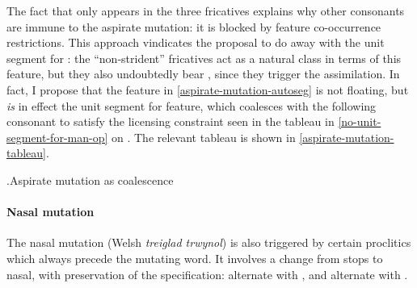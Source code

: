 The fact that  only appears in the three fricatives \ipa{[f~θ~χ]} explains why other consonants are immune to the aspirate mutation: it is blocked by feature co\hyp occurrence restrictions. This approach vindicates the proposal to do away with the unit segment for : the \enquote{non\hyp strident} fricatives \ipa{[f~θ~χ]} act as a natural class in terms of this feature, but they also undoubtedly bear , since they trigger the  assimilation. In fact, I propose that the  feature in \cref{aspirate-mutation-autoseg} is not floating, but \emph{is} in effect the unit segment for  feature, which coalesces with the following consonant to satisfy the licensing constraint seen in the tableau in \ref{no-unit-segment-for-man-op} on . The relevant tableau is shown in \cref{aspirate-mutation-tableau}.

\ex.\label{aspirate-mutation-tableau}Aspirate mutation as coalescence\\

\paragraph{Nasal mutation}
\label{sec:nasal-mutation}

The nasal mutation (Welsh \emph{treiglad trwynol}) is also triggered by certain proclitics which always precede the mutating word. It involves a change from stops to nasal, with preservation of the  specification: \ipa{[p~t~k]} alternate with \ipa{[mh~nh~ŋh]}, and \ipa{[b~d~ɡ]} alternate with \ipa{[m~n~ŋ]}.

